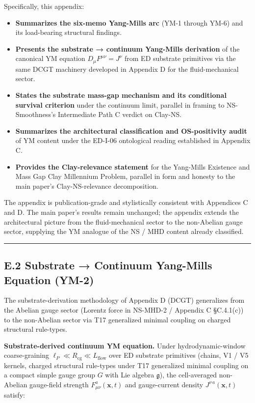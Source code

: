 \documentclass[
]{article}
\providecommand{\tightlist}{%
  \setlength{\itemsep}{0pt}\setlength{\parskip}{0pt}}
\begin{document}
Specifically, this appendix:

\begin{itemize}
\tightlist
\item
  \textbf{Summarizes the six-memo Yang-Mills arc} (YM-1 through YM-6)
  and its load-bearing structural findings.
\item
  \textbf{Presents the substrate → continuum Yang-Mills derivation} of
  the canonical YM equation \(D_\mu F^{\mu\nu} = J^\nu\) from ED
  substrate primitives via the same DCGT machinery developed in Appendix
  D for the fluid-mechanical sector.
\item
  \textbf{States the substrate mass-gap mechanism and its conditional
  survival criterion} under the continuum limit, parallel in framing to
  NS-Smoothness's Intermediate Path C verdict on Clay-NS.
\item
  \textbf{Summarizes the architectural classification and OS-positivity
  audit} of YM content under the ED-I-06 ontological reading established
  in Appendix C.
\item
  \textbf{Provides the Clay-relevance statement} for the Yang-Mills
  Existence and Mass Gap Clay Millennium Problem, parallel in form and
  honesty to the main paper's Clay-NS-relevance decomposition.
\end{itemize}

The appendix is publication-grade and stylistically consistent with
Appendices C and D. The main paper's results remain unchanged; the
appendix extends the architectural picture from the fluid-mechanical
sector to the non-Abelian gauge sector, supplying the YM analogue of the
NS / MHD content already classified.

\begin{center}\rule{0.5\linewidth}{0.5pt}\end{center}

\subsection{E.2 Substrate → Continuum Yang-Mills Equation
(YM-2)}\label{e.2-substrate-continuum-yang-mills-equation-ym-2}

The substrate-derivation methodology of Appendix D (DCGT) generalizes
from the Abelian gauge sector (Lorentz force in NS-MHD-2 / Appendix C
§C.4.1(c)) to the non-Abelian sector via T17 generalized minimal
coupling on charged structural rule-types.

\textbf{Substrate-derived continuum YM equation.} Under
hydrodynamic-window coarse-graining
\(\ell_P \ll R_\mathrm{cg} \ll L_\mathrm{flow}\) over ED substrate
primitives (chains, V1 / V5 kernels, charged structural rule-types under
T17 generalized minimal coupling on a compact simple gauge group \(G\)
with Lie algebra \(\mathfrak{g}\)), the cell-averaged non-Abelian
gauge-field strength \(F_{\mu\nu}^a(\mathbf{x},t)\) and gauge-current
density \(J^{\nu\,a}(\mathbf{x},t)\) satisfy:
\end{document}
